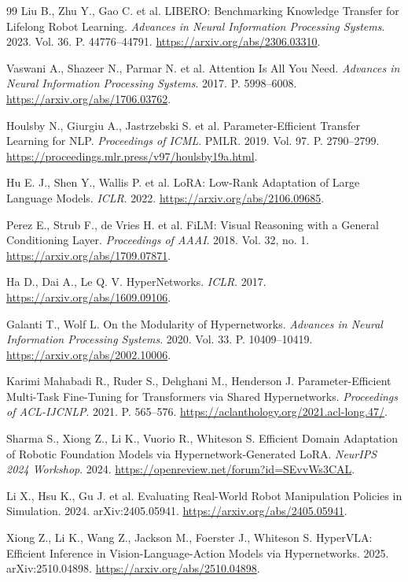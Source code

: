 \documentclass{misisarticle}
\begin{document}
\begin{thebibliography}{99}
Liu B., Zhu Y., Gao C. et al. LIBERO: Benchmarking Knowledge Transfer for Lifelong Robot Learning. \textit{Advances in Neural Information Processing Systems}. 2023. Vol. 36. P. 44776--44791. \url{https://arxiv.org/abs/2306.03310}.

Vaswani A., Shazeer N., Parmar N. et al. Attention Is All You Need. \textit{Advances in Neural Information Processing Systems}. 2017. P. 5998--6008. \url{https://arxiv.org/abs/1706.03762}.

Houlsby N., Giurgiu A., Jastrzebski S. et al. Parameter-Efficient Transfer Learning for NLP. \textit{Proceedings of ICML}. PMLR. 2019. Vol. 97. P. 2790--2799. \url{https://proceedings.mlr.press/v97/houlsby19a.html}.

Hu E. J., Shen Y., Wallis P. et al. LoRA: Low-Rank Adaptation of Large Language Models. \textit{ICLR}. 2022. \url{https://arxiv.org/abs/2106.09685}.

Perez E., Strub F., de Vries H. et al. FiLM: Visual Reasoning with a General Conditioning Layer. \textit{Proceedings of AAAI}. 2018. Vol. 32, no. 1. \url{https://arxiv.org/abs/1709.07871}.

Ha D., Dai A., Le Q. V. HyperNetworks. \textit{ICLR}. 2017. \url{https://arxiv.org/abs/1609.09106}.

Galanti T., Wolf L. On the Modularity of Hypernetworks. \textit{Advances in Neural Information Processing Systems}. 2020. Vol. 33. P. 10409--10419. \url{https://arxiv.org/abs/2002.10006}.

Karimi Mahabadi R., Ruder S., Dehghani M., Henderson J. Parameter-Efficient Multi-Task Fine-Tuning for Transformers via Shared Hypernetworks. \textit{Proceedings of ACL-IJCNLP}. 2021. P. 565--576. \url{https://aclanthology.org/2021.acl-long.47/}.

Sharma S., Xiong Z., Li K., Vuorio R., Whiteson S. Efficient Domain Adaptation of Robotic Foundation Models via Hypernetwork-Generated LoRA. \textit{NeurIPS 2024 Workshop}. 2024. \url{https://openreview.net/forum?id=SEvvWs3CAL}.

Li X., Hsu K., Gu J. et al. Evaluating Real-World Robot Manipulation Policies in Simulation. 2024. arXiv:2405.05941. \url{https://arxiv.org/abs/2405.05941}.

Xiong Z., Li K., Wang Z., Jackson M., Foerster J., Whiteson S. HyperVLA: Efficient Inference in Vision-Language-Action Models via Hypernetworks. 2025. arXiv:2510.04898. \url{https://arxiv.org/abs/2510.04898}.


\end{thebibliography}
\end{document}
